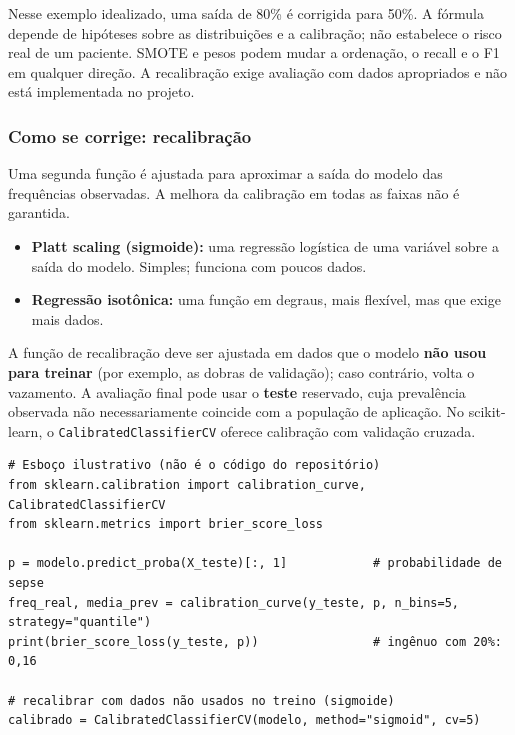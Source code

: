 \documentclass[11pt,a4paper]{article}
\newcommand{\cod}[1]{\texttt{#1}}
\begin{document}
Nesse exemplo idealizado, uma saída de 80\% é corrigida para 50\%. A fórmula depende de hipóteses sobre as distribuições e a calibração; não estabelece o risco real de um paciente. SMOTE e pesos podem mudar a ordenação, o recall e o F1 em qualquer direção. A recalibração exige avaliação com dados apropriados e não está implementada no projeto.

\subsubsection*{Como se corrige: recalibração}

Uma segunda função é ajustada para aproximar a saída do modelo das frequências observadas. A melhora da calibração em todas as faixas não é garantida.
\begin{itemize}
  \item \textbf{Platt scaling (sigmoide):} uma regressão logística de uma variável sobre a saída do modelo. Simples; funciona com poucos dados.
  \item \textbf{Regressão isotônica:} uma função em degraus, mais flexível, mas que exige mais dados.
\end{itemize}

\begin{atencao}
A função de recalibração deve ser ajustada em dados que o modelo \textbf{não usou para treinar} (por exemplo, as dobras de validação); caso contrário, volta o vazamento. A avaliação final pode usar o \textbf{teste} reservado, cuja prevalência observada não necessariamente coincide com a população de aplicação. No scikit-learn, o \cod{CalibratedClassifierCV} oferece calibração com validação cruzada.
\end{atencao}

\begin{lstlisting}
# Esboço ilustrativo (não é o código do repositório)
from sklearn.calibration import calibration_curve, CalibratedClassifierCV
from sklearn.metrics import brier_score_loss

p = modelo.predict_proba(X_teste)[:, 1]            # probabilidade de sepse
freq_real, media_prev = calibration_curve(y_teste, p, n_bins=5, strategy="quantile")
print(brier_score_loss(y_teste, p))                # ingênuo com 20%: 0,16

# recalibrar com dados não usados no treino (sigmoide)
calibrado = CalibratedClassifierCV(modelo, method="sigmoid", cv=5)
\end{lstlisting}
\end{document}
